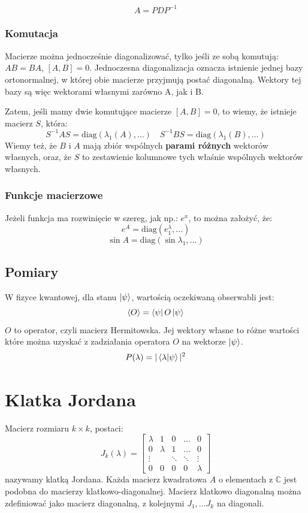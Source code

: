 \documentclass{../notatki}
\begin{document}
$$
A = PDP^{-1}
$$

\subsubsection{Komutacja}

Macierze można jednocześnie diagonalizować, tylko jeśli ze sobą komutują:
$AB = BA$, $[A, B] = 0$. Jednoczesna diagonalizacja oznacza istnienie
jednej bazy ortonormalnej, w której obie macierze przyjmują postać diagonalną.
Wektory tej bazy są więc wektorami własnymi zarówno A, jak i B.

Zatem, jeśli mamy dwie komutujące macierze $[A, B] = 0$, to wiemy, że istnieje
macierz $S$, która:
$$
S^{-1}AS = \textrm{diag}(\lambda_{1}(A), \dots) \quad S^{-1}BS =
\textrm{diag}(\lambda_1(B), \dots)
$$
Wiemy też, że $B$ i $A$ mają zbiór wspólnych \textbf{parami różnych}
wektorów własnych, oraz, że $S$
to zestawienie kolumnowe tych właśnie wspólnych wektorów własnych.

\subsubsection{Funkcje macierzowe}

Jeżeli funkcja ma rozwinięcie w szereg, jak np.: $e^x$, to można założyć, że:
$$
e^A = \textrm{diag}(e^\lambda_1, \dots)
$$
$$
\sin A = \textrm{diag}(\sin \lambda_1, \dots)
$$

\subsection{Pomiary}

W fizyce kwantowej, dla stanu $\ket{\psi}$, wartością oczekiwaną
obserwabli jest:
$$
\langle O \rangle = \bra{\psi} O \ket{\psi}
$$
$O$ to operator, czyli macierz Hermitowska. Jej wektory własne to różne wartości
które można uzyskać z zadziałania operatora $O$ na wektorze $\ket{\psi}$.
$$
P(\lambda) = |\braket{\lambda}{\psi}|^2
$$

\section{Klatka Jordana}

Macierz rozmiaru $k \times k$, postaci:
$$
J_k(\lambda) =
\begin{bmatrix}
  \lambda & 1 & 0 & \hdots & 0 \\
  0 & \lambda & 1 & \hdots & 0 \\
  \vdots & & \ddots & \ddots & \vdots \\
  0 & 0 & 0 & 0 & \lambda
\end{bmatrix}
$$
nazywamy klatką Jordana. Każda macierz kwadratowa $A$ o elementach z
$\mathbb{C}$ jest podobna do macierzy klatkowo-diagonalnej.
Macierz klatkowo
diagonalną można zdefiniować jako macierz diagonalną, z kolejnymi
$J_1, \dots J_k$ na diagonali.
\end{document}
